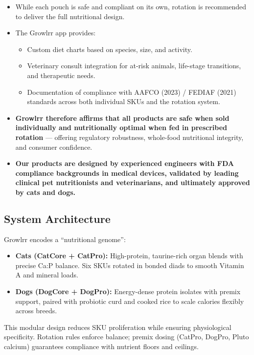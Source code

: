 \begin{itemize}[leftmargin=1.5em]
\item While each pouch is safe and compliant on its own, rotation is recommended to deliver the full nutritional design.
\item The Growlrr app provides:
  \begin{itemize}
  \item Custom diet charts based on species, size, and activity.
  \item Veterinary consult integration for at-risk animals, life-stage transitions, and therapeutic needs.
  \item Documentation of compliance with AAFCO (2023) / FEDIAF (2021) standards across both individual SKUs and the rotation system.
  \end{itemize}
\item \textbf{Growlrr therefore affirms that all products are safe when sold individually and nutritionally optimal when fed in prescribed rotation} --- offering regulatory robustness, whole-food nutritional integrity, and consumer confidence.
\item \textbf{Our products are designed by experienced engineers with FDA compliance backgrounds in medical devices, validated by leading clinical pet nutritionists and veterinarians, and ultimately approved by cats and dogs.}
\end{itemize}

\subsection*{System Architecture}

Growlrr encodes a ``nutritional genome'':

\begin{itemize}[leftmargin=1.5em]
\item \textbf{Cats (CatCore + CatPro):} High-protein, taurine-rich organ blends with precise Ca:P balance. Six SKUs rotated in bonded diads to smooth Vitamin A and mineral loads.
\item \textbf{Dogs (DogCore + DogPro):} Energy-dense protein isolates with premix support, paired with probiotic curd and cooked rice to scale calories flexibly across breeds.
\end{itemize}

This modular design reduces SKU proliferation while ensuring physiological specificity. Rotation rules enforce balance; premix dosing (CatPro, DogPro, Pluto calcium) guarantees compliance with nutrient floors and ceilings.

